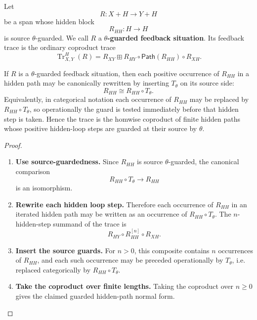 \begin{definition}
\label{def:predicate-guarded-trace}
Let
\[
  R:X+H\to Y+H
\]
be a span whose hidden block
\[
  R_{HH}:H\to H
\]
is source \(\theta\)-guarded. We call \(R\) a
\textbf{\(\theta\)-guarded feedback situation}. Its feedback trace is the
ordinary coproduct trace
\[
  \operatorname{Tr}^{H}_{X,Y}(R)
  =
  R_{XY}
  \boxplus
  R_{HY}\circ\mathsf{Path}(R_{HH})\circ R_{XH}.
\]
\end{definition}

\begin{proposition}
\label{prop:guarded-hidden-path-normal-form}
If \(R\) is a \(\theta\)-guarded feedback situation, then each positive
occurrence of \(R_{HH}\) in a hidden path may be canonically rewritten by
inserting \(T_\theta\) on its source side:
\[
  R_{HH}\cong R_{HH}\circ T_\theta .
\]
Equivalently, in categorical notation each occurrence of \(R_{HH}\) may be
replaced by \(R_{HH}\circ T_\theta\), so operationally the guard is tested
immediately before that hidden step is taken. Hence the trace is the homwise
coproduct of finite hidden paths whose positive hidden-loop steps are guarded
at their source by \(\theta\).
\end{proposition}

\begin{proof}
\begin{enumerate}
  \item \textbf{Use source-guardedness.}
  Since \(R_{HH}\) is source \(\theta\)-guarded, the canonical comparison
  \[
    R_{HH}\circ T_\theta\longrightarrow R_{HH}
  \]
  is an isomorphism.

  \item \textbf{Rewrite each hidden loop step.}
  Therefore each occurrence of \(R_{HH}\) in an iterated hidden path may be
  written as an occurrence of \(R_{HH}\circ T_\theta\). The \(n\)-hidden-step
  summand of the trace is
  \[
    R_{HY}\circ R_{HH}^{[n]}\circ R_{XH}.
  \]

  \item \textbf{Insert the source guards.}
  For \(n>0\), this composite contains \(n\) occurrences of \(R_{HH}\), and
  each such occurrence may be preceded operationally by \(T_\theta\), i.e.
  replaced categorically by \(R_{HH}\circ T_\theta\).

  \item \textbf{Take the coproduct over finite lengths.}
  Taking the coproduct over \(n\geq 0\) gives the claimed guarded hidden-path
  normal form.
\end{enumerate}
\end{proof}

